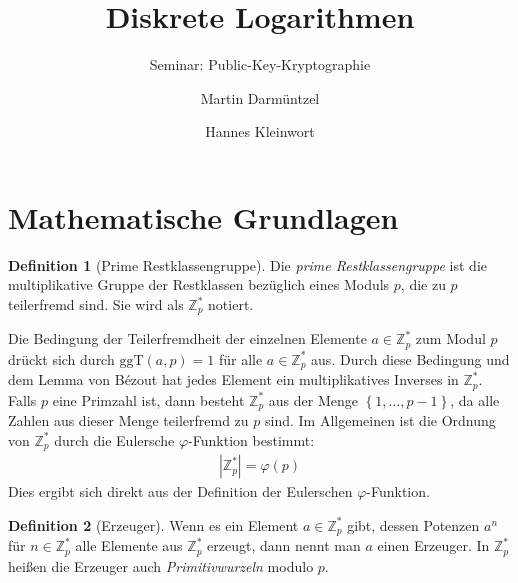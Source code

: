 \documentclass[
  a4paper,
  11pt,
]{scrartcl}
\title{Diskrete Logarithmen}
\subtitle{Seminar: Public-Key-Kryptographie}
\author{%
  Martin Darmüntzel \and Hannes Kleinwort
}
\theoremstyle{plain}
\theoremstyle{definition}
\newtheorem{definition}{Definition}
\theoremstyle{remark}
\newcommand{\Z}{\mathbb{Z}}
\newcommand{\ggT}{\text{ggT}}
\begin{document}
\maketitle

\section{Mathematische Grundlagen}
\label{sec:mathematische_grundlagen}

\begin{definition}[Prime Restklassengruppe]
  Die \emph{prime Restklassengruppe} ist die multiplikative Gruppe der
  Restklassen bezüglich eines Moduls $p$, die zu $p$ teilerfremd sind. Sie wird
  als $\Z_p^*$ notiert.
\end{definition}

Die Bedingung der Teilerfremdheit der einzelnen Elemente $a \in \Z_p^*$ zum
Modul $p$ drückt sich durch $\ggT(a, p) = 1$ für alle $a \in \Z_p^*$ aus. Durch
diese Bedingung und dem Lemma von Bézout hat jedes Element ein multiplikatives
Inverses in $\Z_p^*$. Falls $p$ eine Primzahl ist, dann besteht $\Z_p^*$ aus
der Menge $\left\{1, \ldots, p-1\right\}$, da alle Zahlen aus dieser Menge
teilerfremd zu $p$ sind. Im Allgemeinen ist die Ordnung von $\Z_p^*$ durch die
Eulersche $\varphi$-Funktion bestimmt:
\begin{align*}
  \left| \Z_p^* \right| = \varphi(p)
\end{align*}
Dies ergibt sich direkt aus der Definition der Eulerschen $\varphi$-Funktion.

\begin{definition}[Erzeuger]
  Wenn es ein Element $a \in \Z_p^*$ gibt, dessen Potenzen $a^n$ für
  $n \in \Z_p^*$ alle Elemente aus $\Z_p^*$ erzeugt, dann nennt man $a$ einen
  Erzeuger. In $\Z_p^*$ heißen die Erzeuger auch \emph{Primitivwurzeln} modulo
  $p$.
\end{definition}
\end{document}
